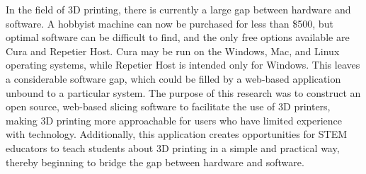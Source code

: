 In the field of 3D printing, there is currently a large gap between hardware and software.
A hobbyist machine can now be purchased for less than \$500, but optimal software can be difficult to find, and the only free options available are Cura and Repetier Host. 
Cura may be run on the Windows, Mac, and Linux operating systems, while Repetier Host is intended only for Windows.
This leaves a considerable software gap, which could be filled by a web-based application unbound to a particular system.
The purpose of this research was to construct an open source, web-based slicing software to facilitate the use of 3D printers, making 3D printing more approachable for users who have limited experience with technology. 
Additionally, this application creates opportunities for STEM educators to teach students about 3D printing in a simple and practical way, thereby beginning to bridge the gap between hardware and software.
